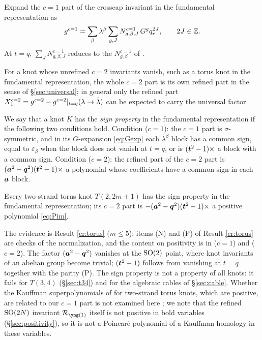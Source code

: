 \begin{definition}\label{def:c1}
Expand the $c = 1$ part of the crosscap invariant in the fundamental representation as
\begin{equation}\label{eq:Gexp}
g^{c=1} = \sum_\beta \lambda^\beta \sum_{g, J} N^{c=1}_{g,\beta,J}\, G^g q_r^{2J},\qquad 2J \in \mathbb{Z}.
\end{equation}
At $t = q$, $\sum_J N^{c=1}_{g,\beta,J}$ reduces to the $N^{c=1}_{g,\beta}$ of \cite{Marino09}.
\end{definition}
For a knot whose unrefined $c = 2$ invariants vanish, such as a torus knot in the fundamental representation, the whole $c = 2$ part is its own refined part in the sense of \S\ref{sec:universal}; in general only the refined part $X_1^{c=2} = g^{c=2} - g^{c=2}|_{t=q}(\lambda \to \tilde\lambda)$ can be expected to carry the universal factor.

\begin{definition}\label{def:signprop}
We say that a knot $K$ has the \emph{sign property} in the fundamental representation if the following two conditions hold. Condition ($c{=}1$): the $c = 1$ part is $\sigma$-symmetric, and in its $G$-expansion \eqref{eq:Gexp} each $\lambda^\beta$ block has a common sign, equal to $\varepsilon_\beta$ when the block does not vanish at $t = q$, or is $(\bm{t}^2 - 1)\times$ a block with a common sign. Condition ($c{=}2$): the refined part of the $c = 2$ part is $(\bm{a}^2 - \bm{q}^2)(\bm{t}^2 - 1)\times$ a polynomial whose coefficients have a common sign in each $\bm{a}$ block.
\end{definition}
\begin{conjecture}\label{conj:criterion}
Every two-strand torus knot $T(2,2m+1)$ has the sign property in the fundamental representation; its $c = 2$ part is $-(\bm{a}^2 - \bm{q}^2)(\bm{t}^2 - 1)\times$ a positive polynomial \eqref{eq:Pim}.
\end{conjecture}
The evidence is Result \ref{cr:torus} ($m \le 5$); items (N) and (P) of Result \ref{cr:torus} are checks of the normalization, and the content on positivity is in ($c{=}1$) and ($c{=}2$). The factor $(\bm{a}^2 - \bm{q}^2)$ vanishes at the $\mathrm{SO}(2)$ point, where knot invariants of an abelian group become trivial; $(\bm{t}^2 - 1)$ follows from vanishing at $t = q$ together with the parity (P). The sign property is not a property of all knots: it fails for $T(3,4)$ (\S\ref{sec:t34}) and for the algebraic cables of \S\ref{sec:cable}. Whether the Kauffman superpolynomials of \cite{GW05} for two-strand torus knots, which are positive, are related to our $c = 1$ part is not examined here \open; we note that the refined $\mathrm{SO}(2N)$ invariant $\Rred_{\yone}$ itself is not positive in bold variables (\S\ref{sec:positivity}), so it is not a Poincar\'e polynomial of a Kauffman homology in these variables.

